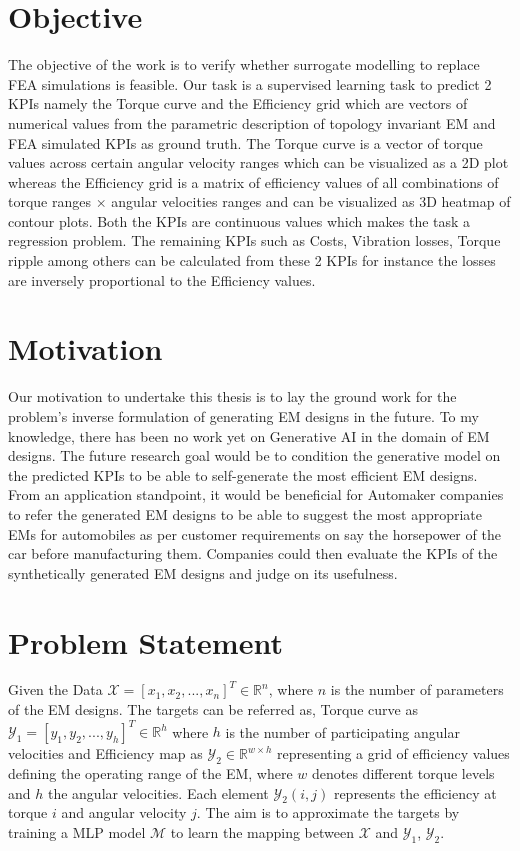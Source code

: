 \documentclass{report} %
\begin{document}
\section{Objective}\label{sec:Objective}
The objective of the work is to verify whether surrogate modelling to replace \ac{FEA} simulations is feasible.
Our task is a supervised learning task to predict 2 KPIs namely the Torque curve and the Efficiency grid which are vectors of numerical values 	 
from the parametric description of topology invariant \ac{EM} and \ac{FEA} simulated \ac{KPI}s as ground truth. 
The Torque curve is a vector of torque values across certain angular velocity ranges which can be visualized as a 2\ac{D} plot whereas the Efficiency grid is a matrix of 
efficiency values of all combinations of torque ranges $\times$ angular velocities ranges and can be visualized as 3\ac{D} heatmap of contour plots. 
Both the \ac{KPI}s are continuous values which makes the task a regression problem. 
The remaining \ac{KPI}s such as Costs, Vibration losses, Torque ripple among others can be calculated from these 2 \ac{KPI}s for instance the losses 
are inversely proportional to the Efficiency values.

\section{Motivation}\label{sec:Motivation}
Our motivation to undertake this thesis is to lay the ground work for the problem's inverse formulation of generating \ac{EM} designs in the future. To my knowledge, 
there has been no work yet on Generative AI in the domain of \ac{EM} designs. The future research goal would be to condition the generative model on the predicted 
\ac{KPI}s to be able to self-generate the most efficient \ac{EM} designs. From an application standpoint, it would be beneficial for Automaker companies to refer the 
generated \ac{EM} designs to be able to suggest the most appropriate \ac{EM}s for automobiles as per customer requirements on say the horsepower of the car before manufacturing them. 
Companies could then evaluate the \ac{KPI}s of the synthetically generated \ac{EM} designs and judge on its usefulness. 

\section{Problem Statement}\label{sec:Problem Statement}

Given the Data $\mathcal{X}  = [x_1, x_2, ..., x_{n}]^T \in \mathbb{R}^{n}$, where $n$ is the number of parameters of the \ac{EM} designs. 
The targets can be referred as, Torque curve as $\mathcal{Y}_1 = [y_1, y_2, ..., y_{h}]^T \in \mathbb{R}^{h}$ where $h$ is the number of participating angular velocities and
Efficiency map as $\mathcal{Y}_2 \in \mathbb{R}^{w \times h}$ representing a grid of efficiency values defining the operating range of the \ac{EM}, where $w$ denotes 
different torque levels and $h$ the angular velocities. Each element $\mathcal{Y}_2(i,j)$ represents the efficiency at torque $i$ and angular velocity $j$.
The aim is to approximate the targets by training a \ac{MLP} model $\mathcal{M}$ to learn the mapping between $\mathcal{X}$ and $\mathcal{Y}_1$, $\mathcal{Y}_2$.
\end{document}
